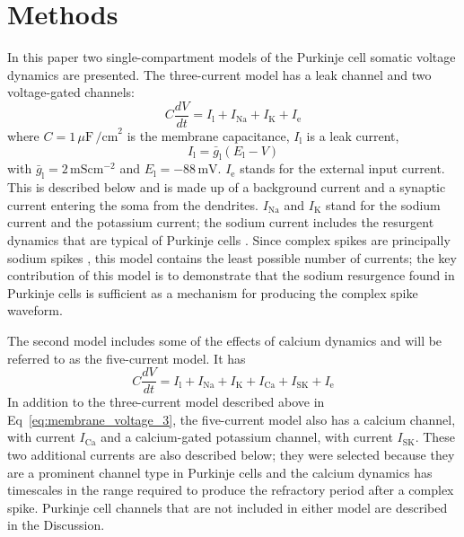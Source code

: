 \documentclass[twocolumn]{svjour3}          %
\newcommand{\mv}{\,\mathrm{mV}}
\newcommand{\msi}{\,\mathrm{mS cm^{-2}}}
\renewcommand{\k}{\mathrm{K}}
\newcommand{\ca}{\mathrm{Ca}}
\newcommand{\na}{\mathrm{Na}}
\newcommand{\sk}{\mathrm{SK}}
\newcommand{\leak}{\mathrm{l}}
\begin{document}
\section{Methods}



In this paper two single-compartment models of the Purkinje
cell somatic voltage dynamics are presented. The three-current model has
a leak channel and two voltage-gated channels:
\begin{equation}
\label{eq:membrane_voltage_3}
C\frac{dV}{dt} =I_\leak+I_{\na}+I_\k+I_{\mathrm{e}}
\end{equation}
where $C = 1\,\mu\mathrm{F}\,\mathrm{\slash cm}^{2}$ is the membrane capacitance,
$I_{\leak}$ is a leak current,
\begin{equation}
\label{eq:I_L}
I_{\leak} =\bar{g}_{\leak}(E_\leak-V)
\end{equation}
with $\bar{g}_{\leak} = 2\msi$ and
$E_{\leak}=-88\mv$. $I_{\mathrm{e}}$ stands for the external input
current. This is described below and is made up of a background
current and a synaptic current entering the soma from the
dendrites. $I_{\na}$ and $I_{\k}$ stand for the sodium current and the
potassium current; the sodium current includes the resurgent dynamics
that are typical of Purkinje cells
\citep{RamanBean1997,RamanBean2001,KhaliqEtAl2003,KhaliqRaman2006}. Since
complex spikes are principally sodium spikes \citep{StuartHausser1994},
this model contains the least possible number of currents; the key
contribution of this model is to demonstrate that the sodium
resurgence found in Purkinje cells is sufficient as a mechanism for
producing the complex spike waveform.

The second model includes some of the effects of calcium dynamics and
will be referred to as the five-current model. It has
\begin{equation}
\label{eq:membrane_voltage_5}
C\frac{dV}{dt} =I_{\leak}+I_{\na}+I_\k+I_\ca+I_\sk+I_{\mathrm{e}}
\end{equation}
In addition to the three-current model described above in
Eq~\ref{eq:membrane_voltage_3}, the five-current model also has a
calcium channel, with current $I_\ca$ and a calcium-gated potassium
channel, with current $I_\sk$. These two additional currents are also
described below; they were selected because they are a prominent
channel type in Purkinje cells and the calcium dynamics has timescales
in the range required to produce the refractory period after a complex
spike. Purkinje cell channels that are not
included in either model are described in the Discussion.
\end{document}
